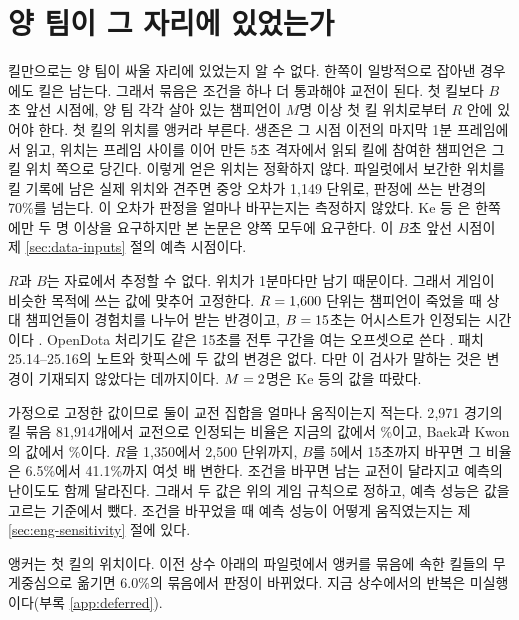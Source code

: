 \section{양 팀이 그 자리에 있었는가}
\label{sec:eng-gate}

킬만으로는 양 팀이 싸울 자리에 있었는지 알 수 없다. 한쪽이 일방적으로 잡아낸 경우에도 킬은 남는다. 그래서 묶음은 조건을 하나 더 통과해야 교전이 된다. 첫 킬보다 $B$초 앞선 시점에, 양 팀 각각 살아 있는 챔피언이 $M$명 이상 첫 킬 위치로부터 $R$ 안에 있어야 한다. 첫 킬의 위치를 앵커라 부른다. 생존은 그 시점 이전의 마지막 1분 프레임에서 읽고, 위치는 프레임 사이를 이어 만든 5초 격자에서 읽되 킬에 참여한 챔피언은 그 킬 위치 쪽으로 당긴다. 이렇게 얻은 위치는 정확하지 않다. 파일럿에서 보간한 위치를 킬 기록에 남은 실제 위치와 견주면 중앙 오차가 1{,}149 단위로, 판정에 쓰는 반경의 70\%를 넘는다. 이 오차가 판정을 얼마나 바꾸는지는 측정하지 않았다. Ke 등 \cite{ke2022}은 한쪽에만 두 명 이상을 요구하지만 본 논문은 양쪽 모두에 요구한다. 이 $B$초 앞선 시점이 제 \ref{sec:data-inputs} 절의 예측 시점이다.

$R$과 $B$는 자료에서 추정할 수 없다. 위치가 1분마다만 남기 때문이다. 그래서 게임이 비슷한 목적에 쓰는 값에 맞추어 고정한다. $R = 1{,}600$ 단위는 챔피언이 죽었을 때 상대 챔피언들이 경험치를 나누어 받는 반경이고, $B = 15$초는 어시스트가 인정되는 시간이다 \cite{lolwiki2026experience,lolwiki2026assist}. OpenDota 처리기도 같은 15초를 전투 구간을 여는 오프셋으로 쓴다 \cite{opendota2018processteamfights}. 패치 25.14--25.16의 노트와 핫픽스에 두 값의 변경은 없다. 다만 이 검사가 말하는 것은 변경이 기재되지 않았다는 데까지이다. $M = 2$명은 Ke 등의 값을 따랐다.

가정으로 고정한 값이므로 둘이 교전 집합을 얼마나 움직이는지 적는다. 2{,}971 경기의 킬 묶음 81{,}914개에서 교전으로 인정되는 비율은 지금의 값에서 \gateShareAdopted{}\%이고, Baek과 Kwon \cite{baek2026killconditioned}의 값에서 \gateShareCog{}\%이다. $R$을 1{,}350에서 2{,}500 단위까지, $B$를 5에서 15초까지 바꾸면 그 비율은 6.5\%에서 41.1\%까지 여섯 배 변한다. 조건을 바꾸면 남는 교전이 달라지고 예측의 난이도도 함께 달라진다. 그래서 두 값은 위의 게임 규칙으로 정하고, 예측 성능은 값을 고르는 기준에서 뺐다. 조건을 바꾸었을 때 예측 성능이 어떻게 움직였는지는 제 \ref{sec:eng-sensitivity} 절에 있다.

앵커는 첫 킬의 위치이다. 이전 상수 아래의 파일럿에서 앵커를 묶음에 속한 킬들의 무게중심으로 옮기면 6.0\%의 묶음에서 판정이 바뀌었다. 지금 상수에서의 반복은 미실행이다(부록 \ref{app:deferred}).
